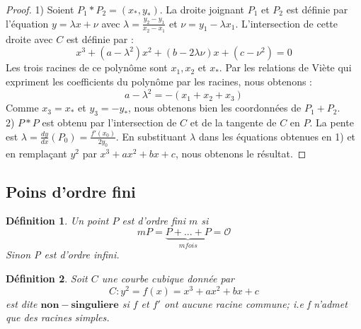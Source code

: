 \documentclass[a4paper]{article}
\newtheorem{definition}{Définition}
\begin{document}
\begin{proof}
1) Soient $P_{1}*P_{2}=(x_{*},y_{*})$.
La droite joignant $P_{1}$ et $P_{2}$ est définie par l'équation $y=\lambda x+\nu$ avec $\lambda=\frac{y_{2}-y_{1}}{x_{2}-x_{1}}$ et $\nu=y_{1}-\lambda x_{1}$.
L'intersection de cette droite avec $C$ est définie par :
\begin{equation*}
x^3+(a-\lambda^2)x^2+(b-2\lambda\nu)x+(c-\nu^2)=0
\end{equation*}
Les trois racines de ce polynôme sont $x_{1},x_{2}$ et $x_{*}$.
Par les relations de Viète qui expriment les coefficients du polynôme par les racines, nous obtenons :
\begin{equation*}
a-\lambda^2=-(x_{1}+x_{2}+x_{3})
\end{equation*}
Comme $x_{3}=x_{*}$ et $y_{3}=-y_{*}$, nous obtenons bien les coordonnées de $P_{1}+P_{2}$. \\
2) $P*P$ est obtenu par l'intersection de $C$ et de la tangente de $C$ en $P$. La pente est $\lambda={\frac{dy}{dx}}(P_{0})=\frac{f'(x_{0})}{2y_{0}}$. En substituant $\lambda$ dans les équations obtenues en 1) et en remplaçant $y^2$ par $x^3+ax^2+bx+c$, nous obtenons le résultat.

\end{proof}

\newpage
\subsection{Poins d'ordre fini} 
\begin{definition}
Un point $P$ est d'ordre fini $m$ si 
\begin{equation*}
mP= \underbrace{P+...+P}_{m fois} = \mathcal{O}
\end{equation*} 
Sinon P est d'ordre infini.
\end{definition}

\begin{definition}
Soit $C$ une courbe cubique donnée par 
\begin{equation*}
C:y^2=f(x)=x^3+ax^2+bx+c
\label{neutre}
\end{equation*} 
est dite $\mathbf{non-singuliere}$ si $f$ et $f'$ ont aucune racine commune; i.e f n'admet que des racines simples.
\end{definition}
\end{document}
